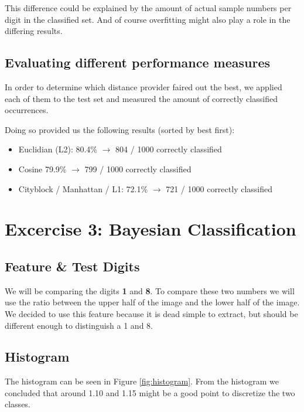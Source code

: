 \documentclass{article}
\begin{document}
This difference could be explained by the amount of actual sample numbers per digit in the classified set.
And of course overfitting might also play a role in the differing results.

\subsection{Evaluating different performance measures}
In order to determine which distance provider faired out the best, we applied each of them to the test set and measured the amount of correctly classified occurrences.

Doing so provided us the following results (sorted by best first):
\begin{itemize}
\item Euclidian (L2): 80.4\% $\rightarrow$ 804 / 1000 correctly classified
\item Cosine 79.9\% $\rightarrow$ 799 / 1000 correctly classified
\item Cityblock / Manhattan / L1: 72.1\% $\rightarrow$ 721 / 1000 correctly classified
\end{itemize}

\section{Excercise 3: Bayesian Classification}
\subsection{Feature \& Test Digits}
We will be comparing the digits \textbf{1} and \textbf{8}.
To compare these two numbers we will use the ratio between the upper half of the image and the lower half of the image. We decided to use this feature because it is dead simple to extract, but should be different enough to distinguish a 1 and 8.


\subsection{Histogram}
The histogram can be seen in Figure \ref{fig:histogram}.
From the histogram we concluded that around 1.10 and 1.15 might be a good point to discretize the two classes.
\end{document}

